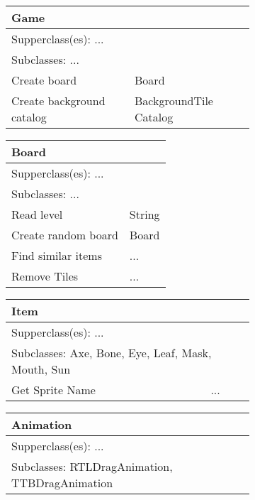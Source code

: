 
\begin{figure}[H]
\begin{subfigure}{}
		\begin{tabular}{|p{1in}|p{1in}|}
			\hline
			\multicolumn{2}{|p{2in}|}{\textbf{Game}} \\ \hline
			\multicolumn{2}{|p{2in}|}{Supperclass(es): ...} \\ \hline
			\multicolumn{2}{|p{2in}|}{Subclasses: ...} \\ \hline
			Create board & Board \\ \hline
			Create background catalog & BackgroundTile Catalog \\ \hline
		\end{tabular}
		\begin{tabular}{|p{1in}|p{1in}|}
			\hline
			\multicolumn{2}{|p{2in}|}{\textbf{Board}} \\ \hline
			\multicolumn{2}{|p{2in}|}{Supperclass(es): ...} \\ \hline
			\multicolumn{2}{|p{2in}|}{Subclasses: ...} \\ \hline
			Read level & String \\ \hline
			Create random board & Board \\ \hline
			Find similar items & ... \\ \hline
			Remove Tiles & ... \\ \hline
		\end{tabular}
\end{subfigure}
\begin{subfigure}{}
		\begin{tabular}{|p{1in}|p{1in}|}
			\hline
			\multicolumn{2}{|p{2in}|}{\textbf{Item}} \\ \hline
			\multicolumn{2}{|p{2in}|}{Supperclass(es): ...} \\ \hline
			\multicolumn{2}{|p{2in}|}{Subclasses: Axe, Bone, Eye, Leaf, Mask, Mouth, Sun} \\ \hline
			Get Sprite Name & ... \\ \hline
		\end{tabular}
		\begin{tabular}{|p{1in}|p{1in}|}
			\hline
			\multicolumn{2}{|p{2in}|}{\textbf{Animation}} \\ \hline
			\multicolumn{2}{|p{2in}|}{Supperclass(es): ...} \\ \hline
			\multicolumn{2}{|p{2in}|}{Subclasses: RTLDragAnimation, TTBDragAnimation} \\ \hline

\end{tabular}
\end{subfigure}
\end{figure}
